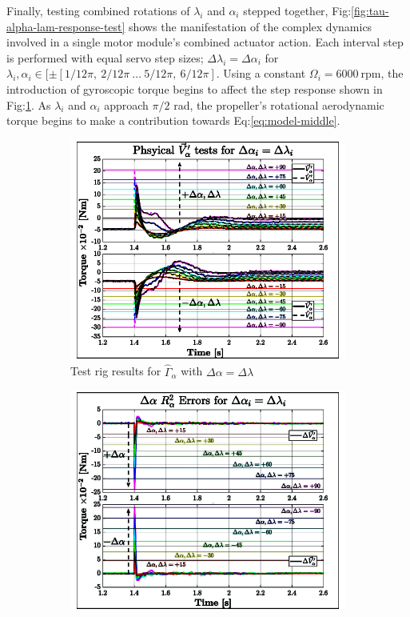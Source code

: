 \par
Finally, testing combined rotations of $\lambda_i$ and $\alpha_i$ stepped together, Fig:\ref{fig:tau-alpha-lam-response-test} shows the manifestation of the complex dynamics involved in a single motor module's combined actuator action. Each interval step is performed with equal servo step sizes; $\Delta\lambda_i=\Delta\alpha_i$ for $\lambda_i,\alpha_i\in[\pm[1/12\pi,~2/12\pi~\ldots~5/12\pi,~6/12\pi]$. Using a constant $\Omega_i=6000~\text{rpm}$, the introduction of gyroscopic torque begins to affect the step response shown in Fig:\ref{fig:tau-alpha-lam}. As $\lambda_i$ and $\alpha_i$ approach $\pi/2$ rad, the propeller's rotational aerodynamic torque begins to make a contribution towards Eq:\ref{eq:model-middle}.
\begin{figure}[htbp]
\centering
\begin{subfigure}{0.49\textwidth}
\centering
\includegraphics[width=\textwidth]{graphs/tau-alph-lam}
\caption{Test rig results for $\hat{\Gamma}_\alpha$ with $\Delta\alpha=\Delta\lambda$}
\label{fig:tau-alpha-lam}
\end{subfigure}
\begin{subfigure}{0.49\textwidth}
\centering
\includegraphics[width=\textwidth]{graphs/tau-alph-lam-r}

\end{subfigure}
\end{figure}
